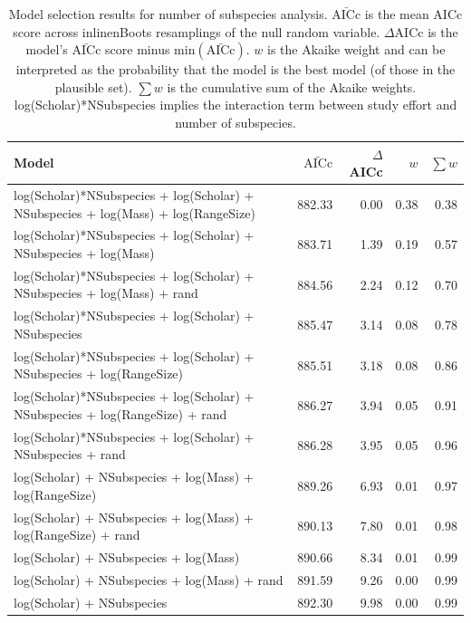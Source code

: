\begin{table}[ht]
\centering
\caption[
  Full model selection results for number of subspecies analysis. 
]{
  Model selection results for number of subspecies analysis. 
  $\bar{\text{AICc}}$ is the mean AICc score across 
inline{nBoots} resamplings of the null random variable. 
  $\Delta$AICc is the model's $\bar{\text{AICc}}$ score minus $\text{min}(\bar{\text{AICc}})$. 
  $w$ is the Akaike weight and can be interpreted as the probability that the model is the best model (of those in the plausible set).
  $\sum w$ is the cumulative sum of the Akaike weights.
  log(Scholar)*NSubspecies implies the interaction term between study effort and number of subspecies.
  } 
\label{A-modelWeights}
\begingroup\tiny
\begin{tabular}{@{}lrrrr@{}}
  \toprule
Model & $\bar{\text{AICc}}$ & $\Delta$AICc & $w$ & $\sum w$ \\ 
  \midrule
log(Scholar)*NSubspecies + log(Scholar) + NSubspecies + log(Mass) + log(RangeSize) & 882.33 & 0.00 & 0.38 & 0.38 \\ 
  log(Scholar)*NSubspecies + log(Scholar) + NSubspecies + log(Mass) & 883.71 & 1.39 & 0.19 & 0.57 \\ 
  log(Scholar)*NSubspecies + log(Scholar) + NSubspecies + log(Mass) + rand & 884.56 & 2.24 & 0.12 & 0.70 \\ 
  log(Scholar)*NSubspecies + log(Scholar) + NSubspecies & 885.47 & 3.14 & 0.08 & 0.78 \\ 
  log(Scholar)*NSubspecies + log(Scholar) + NSubspecies + log(RangeSize) & 885.51 & 3.18 & 0.08 & 0.86 \\ 
  log(Scholar)*NSubspecies + log(Scholar) + NSubspecies + log(RangeSize) + rand & 886.27 & 3.94 & 0.05 & 0.91 \\ 
  log(Scholar)*NSubspecies + log(Scholar) + NSubspecies + rand & 886.28 & 3.95 & 0.05 & 0.96 \\ 
  log(Scholar) + NSubspecies + log(Mass) + log(RangeSize) & 889.26 & 6.93 & 0.01 & 0.97 \\ 
  log(Scholar) + NSubspecies + log(Mass) + log(RangeSize) + rand & 890.13 & 7.80 & 0.01 & 0.98 \\ 
  log(Scholar) + NSubspecies + log(Mass) & 890.66 & 8.34 & 0.01 & 0.99 \\ 
  log(Scholar) + NSubspecies + log(Mass) + rand & 891.59 & 9.26 & 0.00 & 0.99 \\ 
  log(Scholar) + NSubspecies & 892.30 & 9.98 & 0.00 & 0.99 \\ 

\end{tabular}
\end{table}
